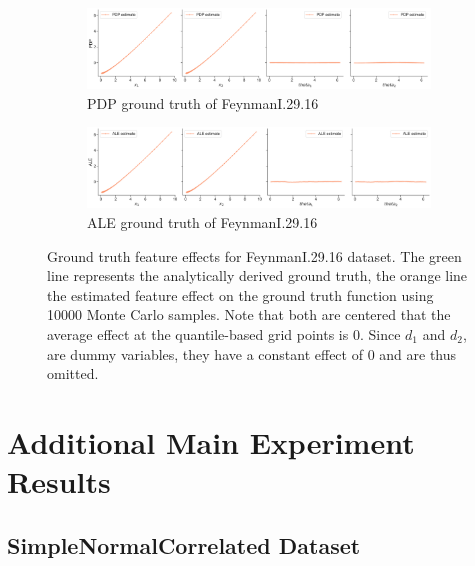 \documentclass[runningheads]{llncs}
\begin{document}
\begin{figure}[h!]
    \begin{subfigure}[b]{\textwidth}
        \centering
        \includegraphics[width=\textwidth]{img/FeynmanI.29.16-all/pdp_groundtruth_comparison.png}
        \caption{PDP ground truth of FeynmanI.29.16}
    \end{subfigure}
    \begin{subfigure}[b]{\textwidth}
        \centering
        \includegraphics[width=\textwidth]{img/FeynmanI.29.16-all/ale_groundtruth_comparison.png}
        \caption{ALE ground truth of FeynmanI.29.16}
    \end{subfigure}
    \caption{Ground truth feature effects for FeynmanI.29.16 dataset. The green line
    represents the analytically derived ground truth, the orange line the estimated feature
    effect on the ground truth function using 10000 Monte Carlo samples. Note that both
    are centered that the average effect at the quantile-based grid points is 0.
    Since $d_1$ and $d_2$, are dummy variables, they have a constant effect of 0 and are
    thus omitted.}
    \label{fig:feynman-groundtruth}  %
\end{figure}

\clearpage
\section{Additional Main Experiment Results}\label{app:additional-results}

\subsection{SimpleNormalCorrelated Dataset}
\end{document}
